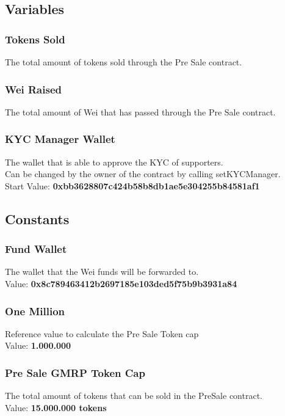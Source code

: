 \documentclass[11pt]{article} %
\begin{document}
\subsection{Variables}

\subsubsection{Tokens Sold}
The total amount of tokens sold through the Pre Sale contract.

\subsubsection{Wei Raised}
The total amount of Wei that has passed through the Pre Sale contract.

\subsubsection{KYC Manager Wallet}
The wallet that is able to approve the KYC of supporters. \\
Can be changed by the owner of the contract by calling setKYCManager.\\
Start Value: \textbf{0xbb3628807c424b58b8db1ae5e304255b84581af1}

\subsection{Constants}
\subsubsection{Fund Wallet}
The wallet that the Wei funds will be forwarded to.\\
Value: \textbf{0x8c789463412b2697185e103ded5f75b9b3931a84}

\subsubsection{One Million}
Reference value to calculate the Pre Sale Token cap\\
Value: \textbf{1.000.000}

\subsubsection{Pre Sale GMRP Token Cap}
The total amount of tokens that can be sold in the PreSale contract.\\
Value: \textbf{15.000.000 tokens}
\end{document}
